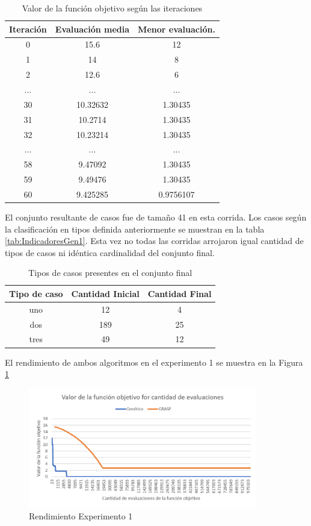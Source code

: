 \documentclass[a4paper,openright,11pt,oneside]{book}
\begin{document}
	\begin{table}[h]
		\begin{center}
			\begin{tabular}{| c | c | c |} \hline
				Iteración & Evaluación media & Menor evaluación. \\ \hline
				0 & 15.6 & 12 \\
				1 & 14 & 8 \\
				2 & 12.6 & 6 \\
				... & ... & ... \\
				30 & 10.32632 & 1.30435\\
				31 & 10.2714 & 1.30435\\
				32 & 10.23214 & 1.30435\\
				... & ... & ...\\
				58 & 9.47092 & 1.30435\\
				59 & 9.49476 & 1.30435\\
				60 & 9.425285 & 0.9756107 \\ \hline
			\end{tabular}
			\caption{Valor de la función objetivo según las iteraciones}
			\label{tab:foGen1}
		\end{center}
	\end{table}

	El conjunto resultante de casos fue de tamaño 41 en esta corrida. Los casos según la clasificación en tipos definida anteriormente se muestran en la tabla \ref{tab:IndicadoresGen1}. Esta vez no todas las corridas arrojaron igual cantidad de tipos de casos ni idéntica cardinalidad del conjunto final.

	\begin{table}[h]
		\begin{center}
			\begin{tabular}{| c | c | c |} \hline
				Tipo de caso & Cantidad Inicial & Cantidad Final \\ \hline
				uno & 12 & 4 \\
				dos & 189 & 25 \\
				tres & 49 & 12 \\ \hline
			\end{tabular}
			\caption{Tipos de casos presentes en el conjunto final}
			\label{tab:TiposdecasosGen1}
		\end{center}
	\end{table}

	El rendimiento de ambos algoritmos en el experimento 1 se muestra en la Figura \ref{CallsMP}
	
	\begin{figure}[h!]
		\centering
		\includegraphics[width=10cm]{./Graphics/Calls-MP.png}
		\caption{Rendimiento Experimento 1}
		\label{CallsMP}
	\end{figure}
\end{document}
